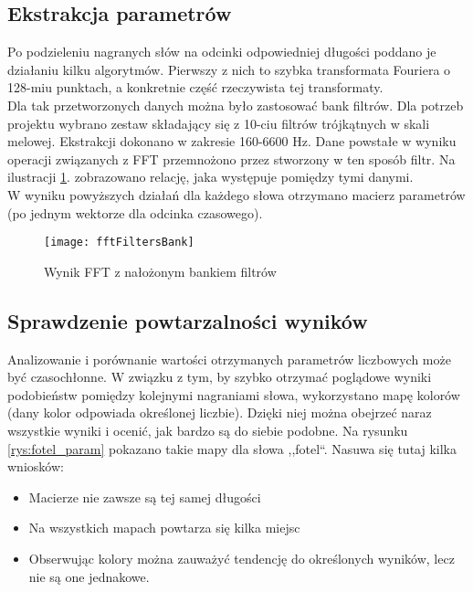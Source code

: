 \subsection{Ekstrakcja parametrów}

Po podzieleniu nagranych słów na odcinki odpowiedniej długości poddano je działaniu kilku algorytmów. Pierwszy z nich to szybka transformata Fouriera o 128-miu punktach, a konkretnie część rzeczywista tej transformaty. \\
Dla tak przetworzonych danych można było zastosować bank filtrów. Dla potrzeb projektu wybrano zestaw składający się z 10-ciu filtrów trójkątnych w skali melowej. Ekstrakcji dokonano w zakresie 160-6600 Hz. Dane powstałe w wyniku operacji związanych z FFT przemnożono przez stworzony w ten sposób filtr. Na ilustracji \ref{rys:fftFiltry}. zobrazowano relację, jaka występuje pomiędzy tymi danymi. \\
W wyniku powyższych działań dla każdego słowa otrzymano macierz parametrów (po jednym wektorze dla odcinka czasowego).

\begin{figure}[H]
	\centering
	\texttt{[image: fftFiltersBank]}
	\caption{Wynik FFT z nałożonym bankiem filtrów}
	\label{rys:fftFiltry}
\end{figure}


\subsection{Sprawdzenie powtarzalności wyników}

Analizowanie i porównanie wartości otrzymanych parametrów liczbowych może być czasochłonne. W związku z tym, by szybko otrzymać poglądowe wyniki podobieństw pomiędzy kolejnymi nagraniami słowa, wykorzystano mapę kolorów (dany kolor odpowiada określonej liczbie). Dzięki niej można obejrzeć naraz wszystkie wyniki i ocenić, jak bardzo są do siebie podobne. Na rysunku \ref{rys:fotel_param} pokazano takie mapy dla słowa ,,fotel``. Nasuwa się tutaj kilka wniosków:

\begin{itemize}
	\item Macierze nie zawsze są tej samej długości
	\item Na wszystkich mapach powtarza się kilka miejsc
	\item Obserwując kolory można zauważyć tendencję do określonych wyników, lecz nie są one jednakowe.
\end{itemize}

